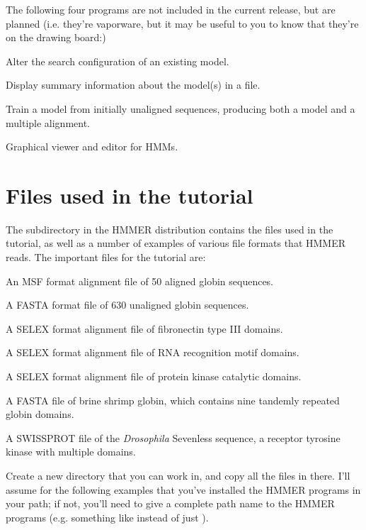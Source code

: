 The following four programs are not included in the current release,
but are planned (i.e. they're vaporware, but it may be useful to you
to know that they're on the drawing board:)

\begin{wideitem}
\item[\emprog{hmmconfig}] Alter the search configuration of an existing model.
\item[\emprog{hmminfo}] Display summary information about the model(s) in a file.
\item[\emprog{hmmtrain}] Train a model from initially unaligned sequences,
producing both a model and a multiple alignment.
\item[\emprog{hmmview}] Graphical viewer and editor for HMMs.
\end{wideitem}

\section{Files used in the tutorial}

The subdirectory  in the HMMER distribution contains the
files used in the tutorial, as well as a number of examples of various
file formats that HMMER reads. The important files for the tutorial
are:

\begin{wideitem}
\item[\emprog{globins50.msf}] An MSF format alignment file of 50 aligned globin sequences.
\item[\emprog{ globins630.fa}] A FASTA format file of 630 unaligned globin sequences.
\item[\emprog{ fn3.slx}] A SELEX format alignment file of fibronectin type III domains.
\item[\emprog{ rrm.slx}] A SELEX format alignment file of RNA recognition
motif domains.
\item[\emprog{ pkinase.slx}] A SELEX format alignment file of protein kinase
catalytic domains.
\item[\emprog{ Artemia.fa}] A FASTA file of brine shrimp globin, which contains
nine tandemly repeated globin domains.
\item[\emprog{ 7LES\_DROME}] A SWISSPROT file of the {\em Drosophila} 
Sevenless sequence, a receptor tyrosine kinase with multiple domains.
\end{wideitem}

Create a new directory that you can work in, and copy all the files in
 there. I'll assume for the following examples that you've
installed the HMMER programs in your path; if not, you'll need to give
a complete path name to the HMMER programs (e.g. something like  instead of just ).

